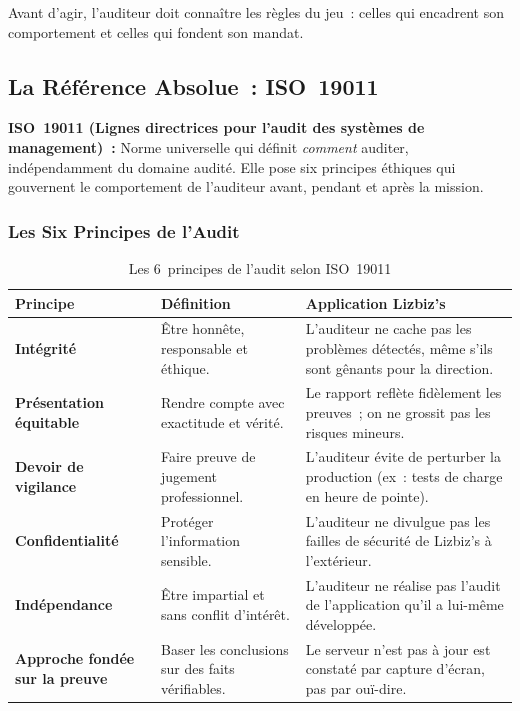 Avant d'agir, l'auditeur doit connaître les règles du jeu~: celles qui encadrent
son comportement et celles qui fondent son mandat.

\subsection{La Référence Absolue~: ISO~19011}
\label{subsec:iso19011}

\begin{boxdef}
\textbf{ISO~19011 (Lignes directrices pour l'audit des systèmes de management)~:}
Norme universelle qui définit \emph{comment} auditer, indépendamment du domaine
audité. Elle pose six principes éthiques qui gouvernent le comportement de l'auditeur
avant, pendant et après la mission.
\end{boxdef}

\subsubsection{Les Six Principes de l'Audit}

\begin{table}[h!]
\centering
\small
\begin{tabular}{p{3cm}p{5cm}p{5cm}}
    \toprule
    \textbf{Principe} & \textbf{Définition} & \textbf{Application Lizbiz's} \\
    \midrule
    \textbf{Intégrité} & Être honnête, responsable et éthique. &
        L'auditeur ne cache pas les problèmes détectés, même s'ils sont
        gênants pour la direction. \\
    \midrule
    \textbf{Présentation équitable} & Rendre compte avec exactitude et vérité. &
        Le rapport reflète fidèlement les preuves~; on ne grossit pas
        les risques mineurs. \\
    \midrule
    \textbf{Devoir de vigilance} & Faire preuve de jugement professionnel. &
        L'auditeur évite de perturber la production (ex~: tests de charge
        en heure de pointe). \\
    \midrule
    \textbf{Confidentialité} & Protéger l'information sensible. &
        L'auditeur ne divulgue pas les failles de sécurité de Lizbiz's
        à l'extérieur. \\
    \midrule
    \textbf{Indépendance} & Être impartial et sans conflit d'intérêt. &
        L'auditeur ne réalise pas l'audit de l'application qu'il a
        lui-même développée. \\
    \midrule
    \textbf{Approche fondée sur la preuve} & Baser les conclusions sur
        des faits vérifiables. &
        \og{}Le serveur n'est pas à jour\fg{} est constaté par capture
        d'écran, pas par ouï-dire. \\
    \bottomrule
\end{tabular}
\caption{Les 6~principes de l'audit selon ISO~19011}
\end{table}

